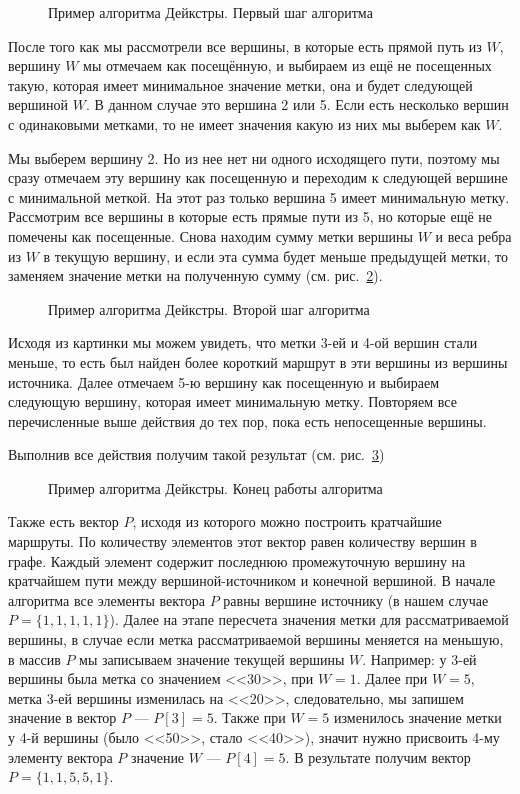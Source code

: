 \begin{figure}[ht]
\caption{Пример алгоритма Дейкстры. Первый шаг алгоритма}
\label{ris:ad-3}
\end{figure}

После того как мы рассмотрели все вершины, в которые есть прямой путь из $W$, вершину $W$ мы отмечаем как посещённую, и выбираем из ещё не посещенных такую, которая имеет минимальное значение метки, она и будет следующей вершиной $W$. 
В данном случае это вершина 2 или 5. 
Если есть несколько вершин с одинаковыми метками, то не имеет значения какую из них мы выберем как $W$.

Мы выберем вершину 2. 
Но из нее нет ни одного исходящего пути, поэтому мы сразу отмечаем эту вершину как посещенную и переходим к следующей вершине с минимальной меткой. 
На этот раз только вершина 5 имеет минимальную метку. 
Рассмотрим все вершины в которые есть прямые пути из 5, но которые ещё не помечены как посещенные. 
Снова находим сумму метки вершины $W$ и веса ребра из $W$ в текущую вершину, и если эта сумма будет меньше предыдущей метки, то заменяем значение метки на полученную сумму (см. рис.~\ref{ris:ad-4}).

\begin{figure}[ht]
\caption{Пример алгоритма Дейкстры. Второй шаг алгоритма}
\label{ris:ad-4}
\end{figure}

Исходя из картинки мы можем увидеть, что метки 3-ей и 4-ой вершин стали меньше, то есть был найден более короткий маршрут в эти вершины из вершины источника. 
Далее отмечаем 5-ю вершину как посещенную и выбираем следующую вершину, которая имеет минимальную метку.
Повторяем все перечисленные выше действия до тех пор, пока есть непосещенные вершины.

Выполнив все действия получим такой результат (см. рис.~\ref{ris:ad-5})
\begin{figure}[ht]
\caption{Пример алгоритма Дейкстры. Конец работы алгоритма}
\label{ris:ad-5}
\end{figure}

Также есть вектор $P$, исходя из которого можно построить кратчайшие маршруты. 
По количеству элементов этот вектор равен количеству вершин в графе.
Каждый элемент содержит последнюю промежуточную вершину на кратчайшем пути между вершиной-источником и конечной вершиной. 
В начале алгоритма все элементы вектора $P$ равны вершине источнику (в нашем случае $P = \{1, 1, 1, 1, 1\}$).
Далее на этапе пересчета значения метки для рассматриваемой вершины, в случае если метка рассматриваемой вершины меняется на меньшую, в массив $P$ мы записываем значение текущей вершины $W$. 
Например: у 3-ей вершины была метка со значением <<30>>, при $W=1$. 
Далее при $W=5$, метка 3-ей вершины изменилась на <<20>>, следовательно, мы запишем значение в вектор $P$ --- $P[3]=5$. 
Также при $W=5$ изменилось значение метки у 4-й вершины (было <<50>>, стало <<40>>), значит нужно присвоить 4-му элементу вектора $P$ значение $W$ --- $P[4]=5$. 
В результате получим вектор $P = \{1, 1, 5, 5, 1\}$. 

